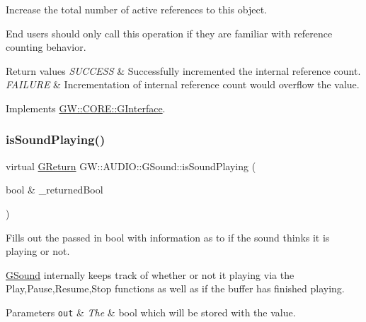 Increase the total number of active references to this object. 

End users should only call this operation if they are familiar with reference counting behavior.


\begin{DoxyRetVals}{Return values}
{\em S\+U\+C\+C\+E\+SS} & Successfully incremented the internal reference count. \\
\hline
{\em F\+A\+I\+L\+U\+RE} & Incrementation of internal reference count would overflow the value. \\
\hline
\end{DoxyRetVals}


Implements \mbox{\hyperlink{class_g_w_1_1_c_o_r_e_1_1_g_interface_a2d710f20bb78e544e8309b5b75c21260}{G\+W\+::\+C\+O\+R\+E\+::\+G\+Interface}}.

\mbox{\label{class_g_w_1_1_a_u_d_i_o_1_1_g_sound_a904241837e93254806b2518f7da24ba9}} 
\subsubsection{\texorpdfstring{is\+Sound\+Playing()}{isSoundPlaying()}}
{\footnotesize\ttfamily virtual \mbox{\hyperlink{namespace_g_w_a67a839e3df7ea8a5c5686613a7a3de21}{G\+Return}} G\+W\+::\+A\+U\+D\+I\+O\+::\+G\+Sound\+::is\+Sound\+Playing (\begin{DoxyParamCaption}\item[{bool \&}]{\+\_\+returned\+Bool }\end{DoxyParamCaption})\hspace{0.3cm}{\ttfamily [pure virtual]}}



Fills out the passed in bool with information as to if the sound thinks it is playing or not. 

\mbox{\hyperlink{class_g_w_1_1_a_u_d_i_o_1_1_g_sound}{G\+Sound}} internally keeps track of whether or not it playing via the Play,Pause,Resume,Stop functions as well as if the buffer has finished playing.


\begin{DoxyParams}[1]{Parameters}
\mbox{\tt out}  & {\em The} & bool which will be stored with the value.\\
\hline
\end{DoxyParams}

